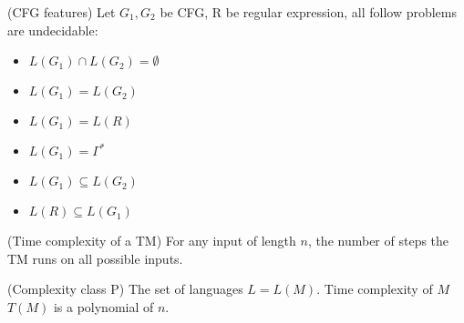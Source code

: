         \begin{theorem}
            (CFG features) Let $G_1,G_2$ be CFG, R be regular expression, all follow problems are undecidable:
            \begin{itemize}
                \item $L\left( G_1 \right) \cap L\left( G_2 \right) =\emptyset$ 
                \item $L\left( G_1 \right) = L\left( G_2 \right) $ 
                \item $L\left( G_1 \right) =L\left( R \right) $ 
                \item $L\left( G_1 \right) =\Gamma^{*}$ 
                \item $L\left( G_1 \right) \subseteq L\left( G_2 \right) $ 
                \item $L\left( R \right) \subseteq L\left( G_1 \right) $
            \end{itemize}
        \end{theorem}
        \begin{definition}
            (Time complexity of a TM) For any input of length $n$, the number of steps the TM runs on all possible inputs.
        \end{definition}
        \begin{definition}
            (Complexity class P) The set of languages $L=L\left( M \right) $. Time complexity of $M$ $T\left( M \right) $ is a polynomial of $n$.
        \end{definition}

